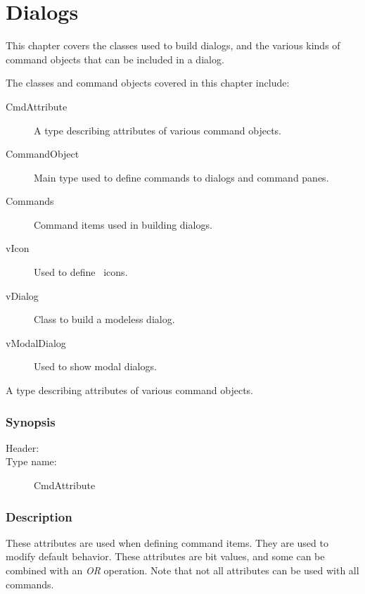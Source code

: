 
\chapter {Dialogs}

This chapter covers the classes used to build dialogs, and the various
kinds of command objects that can be included in a dialog.


The classes and command objects covered in this chapter include:

\begin{description}
	\item[CmdAttribute] A type describing attributes of various command objects.
	\item[CommandObject] Main type used to define commands to dialogs and command panes.
	\item[Commands] Command items used in building dialogs.
	\item[vIcon] Used to define \V\ icons.
	\item[vDialog] Class to build a modeless dialog.
	\item[vModalDialog] Used to show modal dialogs.
\end{description}

\label{sec:cmdattribute}

A type describing attributes of various command objects.

\subsection* {Synopsis}

\begin{description}
	\item [Header:] 
	\item [Type name:] CmdAttribute
\end{description}

\subsection* {Description}

These attributes are used when defining command items.
They are used to modify default behavior. These attributes are
bit values, and some can be combined with an \emph{OR} operation.
Note that not all attributes can be used with all commands.

